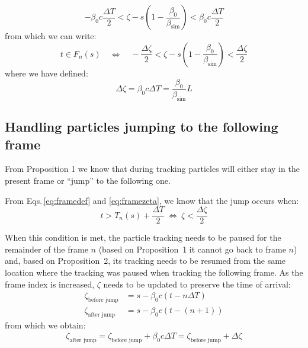 \begin{equation}
-\beta_0 c \frac{\Delta T}{2} < \zeta - s \left(1 -  \frac{\beta_0}{\beta_\text{sim} }\right) < \beta_0 c\frac{\Delta T}{2}
\end{equation}
from which we can write:
\begin{equation}
\boxed{
t \in F_n(s) \quad \Leftrightarrow \quad
-\frac{\Delta \zeta}{2} < \zeta - s \left(1 -  \frac{\beta_0}{\beta_\text{sim} }\right) < \frac{\Delta \zeta}{2}
}
\label{eq:framezeta}
\end{equation}
where we have defined:
\begin{equation}
\boxed{
 \Delta \zeta = \beta_0 c \Delta T = \frac{\beta_0}{\beta_\text{sim}} L
}
\end{equation}

\subsection{Handling particles jumping to the following frame}

From Proposition 1 we know that during tracking particles will either stay in the present frame or ``jump'' to the following one.

From Eqs.\,\ref{eq:framedef} and \ref{eq:framezeta}, we know that the jump occurs when:
\begin{equation}
t > T_n(s) + \frac{\Delta T}{2}
~
\Leftrightarrow
~
\zeta < \frac{\Delta \zeta}{2}
 \end{equation}
 
When this condition is met, the particle tracking needs to be paused for the remainder of the frame $n$ (based on Proposition~1 it cannot go back to frame $n$) and, based on Proposition~2, its tracking needs to be resumed from the same location where the tracking was paused when tracking the following frame.
As the frame index is increased, $\zeta$ needs to be updated to preserve the time of arrival:
\begin{align}
\zeta_\text{before jump} &= s  - \beta_0 c \left( t - n\Delta T \right) \\
\zeta_\text{after jump} &= s  - \beta_0 c \left( t - (n+1) \right)
\end{align}
from which we obtain:
\begin{align}
\boxed{
\zeta_\text{after jump} = \zeta_\text{before jump} + \beta_0 c \Delta T = \zeta_\text{before jump} + \Delta \zeta
}
\end{align}




